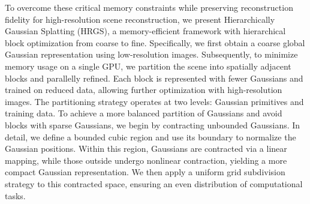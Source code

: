 To overcome these critical memory constraints while preserving reconstruction fidelity for high-resolution scene reconstruction, we present Hierarchically  Gaussian Splatting (HRGS), a memory-efficient framework with hierarchical block optimization from coarse to fine. 
Specifically, we first obtain a coarse global Gaussian representation using low-resolution images. 
Subsequently, to minimize memory usage on a single GPU, we partition the scene into spatially adjacent blocks and parallelly refined. 
Each block is represented with fewer Gaussians and trained on reduced data, allowing further optimization with high-resolution images. The partitioning strategy operates at two levels: Gaussian primitives and training data.
To achieve a more balanced partition of Gaussians and avoid blocks with sparse Gaussians, we begin by contracting unbounded Gaussians. In detail, we define a bounded cubic region and use its boundary to normalize the Gaussian positions. Within this region, Gaussians are contracted via a linear mapping, while those outside undergo nonlinear contraction, yielding a more compact Gaussian representation. We then apply a uniform grid subdivision strategy to this contracted space, ensuring an even distribution of computational tasks.
